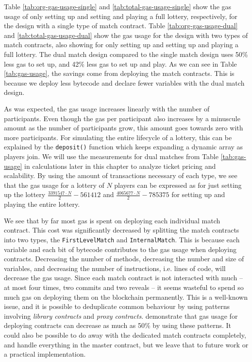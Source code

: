 \noindent
Table \ref{tab:org-gas-usage-single} and \ref{tab:total-gas-usage-single} show the gas usage of only setting up and setting and playing a full lottery, respectively, for the design with a single type of match contract. Table \ref{tab:org-gas-usage-dual} and \ref{tab:total-gas-usage-dual} show the gas usage for the design with two types of match contracts, also showing for only setting up and setting up and playing a full lottery.
The dual match design compared to the single match design uses 50\% less gas to set up, and 42\% less gas to set up and play. As we can see in Table \ref{tab:gas-usage}, the savings come from deploying the match contracts. This is because we deploy less bytecode and declare fewer variables with the dual match design.

As was expected, the gas usage increases linearly with the number of participants. Even though the gas per participant also increases by a minuscule amount as the number of participants grow, this amount goes towards zero with more participants. For simulating the entire lifecycle of a lottery, this can be explained by the \texttt{deposit()} function which keeps expanding a dynamic array as players join. We will use the measurements for dual matches from Table \ref{tab:gas-usage} in calculations later in this chapter to analyze ticket pricing and scalability. By using the amount of transactions necessary of each type, we see that the gas usage for a lottery of $N$ players can be expressed as for just setting up the lottery $\frac{3391547 \cdot N}{2} - 561412$ and $\frac{4065677 \cdot N}{2} - 785375$ for setting up and playing the entire lottery.

We see that by far most gas is spent on deploying each individual match contract. This cost was significantly decreased by splitting the match contracts into two types, the \texttt{FirstLevelMatch} and \texttt{InternalMatch}. This is because each variable and each bit of bytecode contributes to the gas usage when deploying contracts. Decreasing the number of methods, decreasing the number and size of variables, and decreasing the number of instructions, i.e. lines of code, will decrease the gas usage. Since each match contract is not interacted with much – at most four times, two commits and two reveals – it seems wasteful to spend so much gas on deploying them on the blockchain permanently. This is a well-known issue, and it is possible to deduplicate common behaviour by using patterns involving \emph{library contracts} and \emph{proxy contracts}. \cite{lu_solidity_2018} demonstrate that gas usage for deploying contracts can decrease as much as 50\% by using these patterns. It could also be possible to do away with the dedicated match contracts completely, and handle everything in the master contract, but we leave that to future work or a practical implementation.

